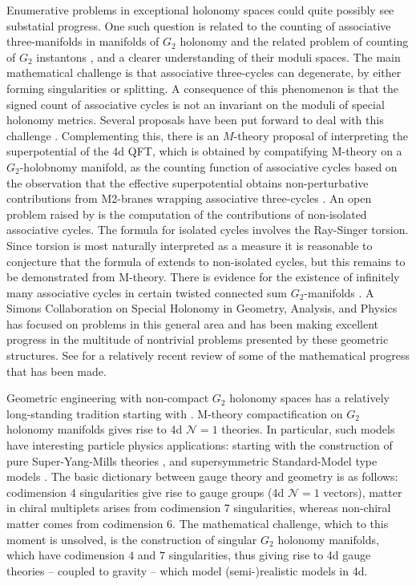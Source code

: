 \documentclass[12pt]{article}
\def\remove#1{{\color [rgb]{1,0,0}\sout{#1}}}
\begin{document}
Enumerative problems in exceptional holonomy spaces could quite possibly see substatial progress. One such question is related to the counting of associative three-manifolds in manifolds of $G_2$ holonomy and the related problem of counting of $G_2$ instantons \cite{Donaldson:2009yq, Joyce:2016fij, Doan:2017qbq}, and a clearer understanding of their moduli spaces.
The main mathematical challenge is that associative three-cycles can degenerate, by either forming singularities or splitting. A consequence of this phenomenon is that the signed count of associative cycles is not an invariant on the moduli of special holonomy metrics.  Several proposals have been put forward to deal with this challenge \cite{Joyce:2016fij, Doan:2017qbq}.
Complementing this, there is an $M$-theory proposal of interpreting the superpotential of the 4d QFT, which is obtained by compatifying M-theory on a $G_2$-holobnomy manifold, as the counting function of associative cycles based on the observation that the effective superpotential obtains non-perturbative contributions from M2-branes wrapping associative three-cycles \cite{Harvey:1999as}. An open problem raised by \cite{Harvey:1999as} is the computation of the contributions of non-isolated associative cycles. The formula for isolated cycles involves the Ray-Singer torsion. Since torsion is most naturally interpreted as a measure it is reasonable to conjecture that the formula of \cite{Harvey:1999as} extends to non-isolated cycles, but this remains to be demonstrated from M-theory. There is evidence for the existence of infinitely many associative cycles in certain twisted connected sum $G_2$-manifolds \cite{Halverson:2014tya, Braun:2018fdp, Acharya:2018nbo}. 
A Simons Collaboration on Special Holonomy in Geometry, Analysis, and Physics \cite{SimonsCollab:SpecialHolonomy}
has focused on problems in this general
area and has been making excellent progress in the multitude
of nontrivial problems presented by these geometric structures. See \cite{DonaldsonICM2018} for a relatively recent review of some of the mathematical progress that has been made. 




Geometric engineering with non-compact  $G_2$ holonomy spaces has a relatively long-standing tradition starting with \cite{Atiyah:2001qf}. M-theory compactification on $G_2$ holonomy manifolds gives rise to 4d $\mathcal{N}=1$ theories. In particular, such models have interesting particle physics applications: starting with the construction of pure Super-Yang-Mills theories \cite{Atiyah:2000zz}, and supersymmetric Standard-Model type models \cite{Acharya:2001gy}. 
The basic dictionary between gauge theory and geometry is as follows: codimension 4 singularities give rise to gauge groups (4d $\mathcal{N}=1$ vectors), 
matter in chiral multiplets arises from codimension 7 singularities, whereas non-chiral matter comes from codimension 6. 
The mathematical challenge, which to this moment is unsolved, is the construction of singular $G_2$ holonomy manifolds, which have 
codimension $4$ and $7$ singularities, thus giving rise to 4d gauge theories -- coupled to gravity -- which model (semi-)realistic models in 4d. 
\end{document}

